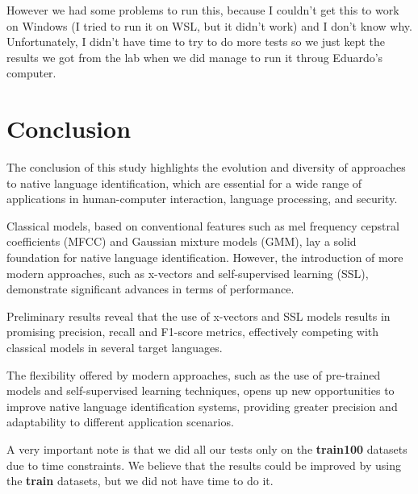 \documentclass{Interspeech2024}
\begin{document}
However we had some problems to run this, because I couldn't get this to work on Windows (I tried to run it on WSL, but it didn't work) and I don't know why. Unfortunately, I didn't have time to try to do more tests so we just kept the results we got from the lab when we did manage to run it throug Eduardo's computer.

\section{Conclusion}
The conclusion of this study highlights the evolution and diversity of approaches to native language identification, which are essential for a wide range of applications in human-computer interaction, language processing, and security.

Classical models, based on conventional features such as mel frequency cepstral coefficients (MFCC) and Gaussian mixture models (GMM), lay a solid foundation for native language identification. However, the introduction of more modern approaches, such as x-vectors and self-supervised learning (SSL), demonstrate significant advances in terms of performance.

Preliminary results reveal that the use of x-vectors and SSL models results in promising precision, recall and F1-score metrics, effectively competing with classical models in several target languages.

The flexibility offered by modern approaches, such as the use of pre-trained models and self-supervised learning techniques, opens up new opportunities to improve native language identification systems, providing greater precision and adaptability to different application scenarios.

A very important note is that we did all our tests only on the \textbf{train100} datasets due to time constraints. We believe that the results could be improved by using the \textbf{train} datasets, but we did not have time to do it.
\end{document}
